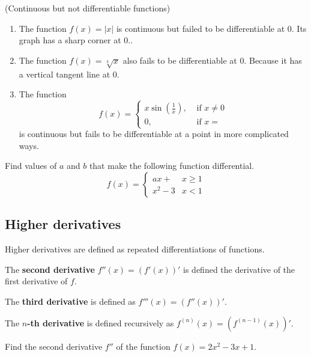 \begin{example}
(Continuous but not differentiable functions)

\begin{enumerate}
\item
  The function \(f(x)=|x|\) is continuous but failed to be
  differentiable at \(0\). Its graph has a sharp corner at \(0.\).
\item
  The function \(f(x)=\sqrt[3]{x}\) also fails to be differentiable at
  \(0\). Because it has a vertical tangent line at \(0\).
\item
  The function
\[f(x)=\begin{cases}x\sin\left(\frac{1}{x}\right),& \text{ if } x\ne 0\\0, & \text{ if } x=\end{cases}\]
is continuous but fails to be differentiable at a point in more
complicated ways.
\end{enumerate}
\end{example}
\vspace*{6\baselineskip}

\begin{example}
Find values of \(a\) and \(b\) that make the following function
differential. \[
f(x)=
\begin{cases}
    ax+ & x\ge 1\\
    x^2-3 & x<1\end{cases}
\]
\end{example}
\vspace*{6\baselineskip}

\hypertarget{higher-derivatives}{%
\subsection{Higher derivatives}\label{higher-derivatives}}

Higher derivatives are defined as repeated differentiations of
functions.

The \textbf{second derivative} \(f''(x)=(f'(x))'\) is defined the
derivative of the first derivative of \(f\).

The \textbf{third derivative} is defined as \(f'''(x)=(f''(x))'\).

The \textbf{\(n\)-th derivative} is defined recursively as
\(f^{(n)}(x)=(f^{(n-1)}(x))'\).

\begin{example}
Find the second derivative \(f''\) of the function \(f(x)=2x^2-3x+1\).
\end{example}
\vspace*{6\baselineskip}

